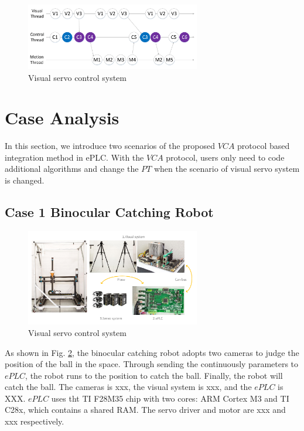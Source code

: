 \documentclass[journal,UTF8]{IEEEtran}
\begin{document}
\begin{figure}
	\centering
	\includegraphics[width=3in]{fig/ThreadExecution.pdf}
	\caption{ Visual servo control system}
	\label{fig:threadExecution}
\end{figure}

\section{Case Analysis}
\label{Case}
In this section, we introduce two scenarios of the proposed $VCA$ protocol based integration method in ePLC. With the $VCA$ protocol, users only need to code additional algorithms and change the $PT$ when the scenario of visual servo system is changed. 
\subsection{Case 1 Binocular Catching Robot}
\begin{figure}
	\centering
	\includegraphics[width=3in]{fig/robot.pdf}
	\caption{ Visual servo control system}
	\label{fig:robot}
\end{figure}
As shown in Fig. \ref{fig:robot}, the binocular catching robot adopts two cameras to judge the position of the ball in the space. Through sending the continuously parameters to $ePLC$, the robot runs to the position to catch the ball. Finally, the robot will catch the ball. The cameras is xxx, the visual system is xxx, and the $ePLC$ is XXX. $ePLC$ uses tht TI F28M35 chip with two cores: ARM Cortex M3 and TI C28x, which contains a shared RAM. The servo driver and motor are xxx and xxx respectively. 
\end{document}
